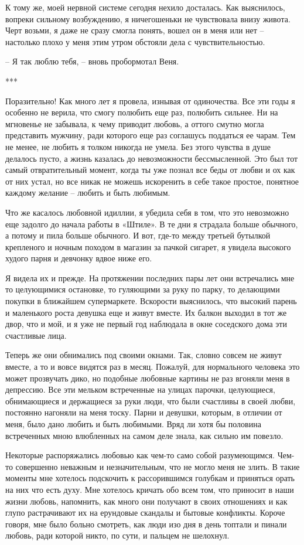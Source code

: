 \documentclass[
]{book}
\begin{document}
К тому же, моей нервной системе сегодня нехило досталась. Как выяснилось, вопреки сильному возбуждению, я ничегошеньки не чувствовала внизу живота. Черт возьми, я даже не сразу смогла понять, вошел он в меня или нет -- настолько плохо у меня этим утром обстояли дела с чувствительностью.

-- Я так люблю тебя, -- вновь пробормотал Веня.

***

Поразительно! Как много лет я провела, изнывая от одиночества. Все эти годы я особенно не верила, что смогу полюбить еще раз, полюбить сильнее. Ни на мгновенье не забывала, к чему приводит любовь, а оттого смутно могла представить мужчину, ради которого еще раз соглашусь поддаться ее чарам. Тем не менее, не любить я толком никогда не умела. Без этого чувства в душе делалось пусто, а жизнь казалась до невозможности бессмысленной. Это был тот самый отвратительный момент, когда ты уже познал все беды от любви и ох как от них устал, но все никак не можешь искоренить в себе такое простое, понятное каждому желание -- любить и быть любимым.

Что же касалось любовной идиллии, я убедила себя в том, что это невозможно еще задолго до начала работы в «Штиле». В те дни я страдала больше обычного, а потому и пила больше обычного. И вот, где-то между третьей бутылкой крепленого и ночным походом в магазин за пачкой сигарет, я увидела высокого худого парня и девчонку вдвое ниже его.

Я видела их и прежде. На протяжении последних пары лет они встречались мне то целующимися остановке, то гуляющими за руку по парку, то делающими покупки в ближайшем супермаркете. Вскорости выяснилось, что высокий парень и маленького роста девушка еще и живут вместе. Их балкон выходил в тот же двор, что и мой, и я уже не первый год наблюдала в окне соседского дома эти счастливые лица.

Теперь же они обнимались под своими окнами. Так, словно совсем не живут вместе, а то и вовсе видятся раз в месяц. Пожалуй, для нормального человека это может прозвучать дико, но подобные любовные картины не раз вгоняли меня в депрессию. Все эти мельком встреченные на улицах парочки, целующиеся, обнимающиеся и держащиеся за руки люди, что были счастливы в своей любви, постоянно нагоняли на меня тоску. Парни и девушки, которым, в отличии от меня, было дано любить и быть любимыми. Вряд ли хотя бы половина встреченных мною влюбленных на самом деле знала, как сильно им повезло.

Некоторые распоряжались любовью как чем-то само собой разумеющимся. Чем-то совершенно неважным и незначительным, что не могло меня не злить. В такие моменты мне хотелось подскочить к рассорившимся голубкам и приняться орать на них что есть духу. Мне хотелось кричать обо всем том, что приносит в наши жизни любовь, напомнить, как много они получают в своих отношениях и как глупо растрачивают их на ерундовые скандалы и бытовые конфликты. Короче говоря, мне было больно смотреть, как люди изо дня в день топтали и пинали любовь, ради которой никто, по сути, и пальцем не шелохнул.
\end{document}
